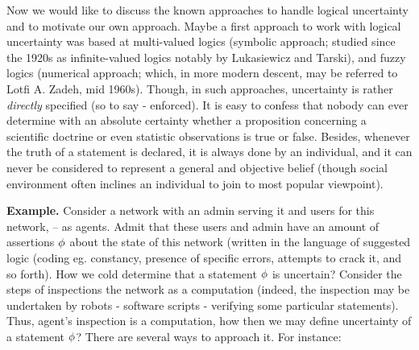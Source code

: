 \documentclass[runningheads]{llncs}
\begin{document}
 Now we would like to discuss the known approaches to handle logical uncertainty and to motivate our own approach. Maybe  a first approach to work with logical uncertainty was
 based at multi-valued logics (symbolic approach; studied since the 1920s as infinite-valued logics notably by Lukasiewicz and Tarski), and fuzzy logics (numerical approach; which, in more modern descent, may be referred to Lotfi A. Zadeh, mid 1960s).
Though, in such approaches, uncertainty is rather {\it directly} specified (so to say - enforced).
It is easy to confess that
 nobody can ever determine with an absolute certainty whether a proposition
 concerning a scientific doctrine or even statistic observations
   is true or false. Besides, whenever the truth of a statement is declared, it is always done by an individual,
   and it can never be considered to represent a general and objective belief (though social environment often inclines an individual to join to most popular
 viewpoint).
 
 \medskip
 
 {\bf Example.} Consider a network with an admin serving it and users for this network, -- as agents.
 Admit that these users and admin have an amount of assertions $\phi$ about the state of this network
 (written in the language of suggested logic (coding eg. constancy, presence of specific errors, attempts to crack it, and so forth). How we cold determine that a statement $\phi$ is uncertain?
 Consider the steps of inspections the network as a computation
 (indeed, the inspection may be undertaken by robots - software scripts - verifying some
 particular statements). Thus, agent's inspection is a computation, how then we may define uncertainty of 
 a statement $\phi$?  There are several ways to approach it.
 For instance:
 
 \smallskip
 
\end{document}
